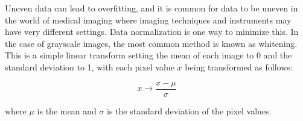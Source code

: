 
Uneven data can lead to overfitting, and it is common for data to be uneven in the world of medical imaging where imaging techniques and instruments may have very different settings. Data normalization is one way to minimize this. In the case of grayscale images, the most common method is known as whitening. This is a simple linear transform setting the mean of each image to 0 and the standard deviation to 1, with each pixel value $x$ being transformed as follows:

\begin{equation}
x \rightarrow \frac{x - \mu}{\sigma}
\end{equation}

where $\mu$ is the mean and $\sigma$ is the standard deviation of the pixel values.